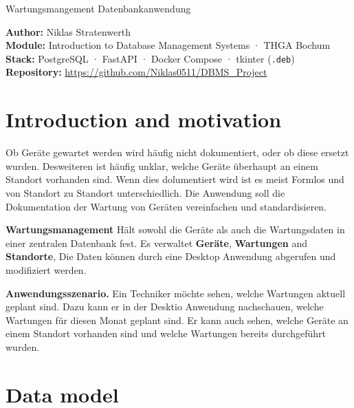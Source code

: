 \documentclass[11pt,a4paper]{article}
\begin{document}
\thispagestyle{empty}
%
{Wartungsmangement Datenbankanwendung}%

\begin{infobox}
\textbf{Author:} Niklas Stratenwerth  \\
\textbf{Module:} Introduction to Database Management Systems · THGA Bochum \\
\textbf{Stack:} PostgreSQL · FastAPI · Docker Compose · tkinter (\texttt{.deb}) \\
\textbf{Repository:} \url{https://github.com/Niklas0511/DBMS_Project} \\
\end{infobox}

\tableofcontents
\vspace{1em}

\section{Introduction and motivation}

Ob Geräte gewartet werden wird häufig nicht dokumentiert, oder ob diese ersetzt wurden.
Desweiteren ist häufig unklar, welche Geräte überhaupt an einem Standort vorhanden sind.
Wenn dies dolumentiert wird ist es meist Formlos und von Standort zu Standort unterschiedlich.
Die Anwendung soll die Dokumentation der Wartung von Geräten vereinfachen und standardisieren.

\textbf{Wartungsmanagement} Hält sowohl die Geräte als auch die Wartungsdaten in einer zentralen Datenbank fest.
Es verwaltet \textbf{Geräte}, \textbf{Wartungen} and \textbf{Standorte}, Die Daten können durch eine Desktop Anwendung abgerufen
und modifiziert werden.

\begin{beispielbox}
\textbf{Anwendungsszenario.} Ein Techniker möchte sehen, welche Wartungen aktuell geplant sind.
Dazu kann er in der Desktio Anwendung nachschauen, welche Wartungen für diesen Monat geplant sind.
Er kann auch sehen, welche Geräte an einem Standort vorhanden sind und welche Wartungen bereits durchgeführt wurden. 
\end{beispielbox}

\section{Data model}
\end{document}
